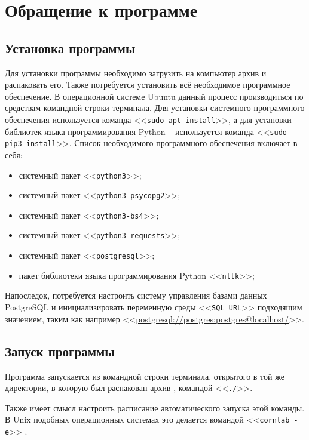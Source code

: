 \documentclass[a4paper,12pt]{article}
\begin{document}
  \newpage
  \section{Обращение к программе}
  \subsection{Установка программы}
  Для установки программы необходимо загрузить на компьютер архив \CRTzip{} и распаковать его.
  Также потребуется установить всё необходимое программное обеспечение.
  В операционной системе Ubuntu данный процесс производиться по средствам командной строки терминала.
  Для установки системного программного обеспечения используется команда <<\texttt{sudo apt install}>>,
  а для установки библиотек языка программирования Python -- используется команда <<\texttt{sudo pip3 install}>>.
  Список необходимого программного обеспечения включает в себя:
  \begin{itemize}
    \item системный пакет <<\texttt{python3}>>;
    \item системный пакет <<\texttt{python3-psycopg2}>>;
    \item системный пакет <<\texttt{python3-bs4}>>;
    \item системный пакет <<\texttt{python3-requests}>>;
    \item системный пакет <<\texttt{postgresql}>>;
    \item пакет библиотеки языка программирования Python <<\texttt{nltk}>>;
  \end{itemize}
  Напоследок, потребуется настроить систему управления базами данных PostgreSQL и инициализировать переменную среды <<\texttt{SQL\_URL}>> подходящим значением, таким как например <<\url{postgresql://postgres:postgres@localhost/}>>.

  \subsection{Запуск программы}
  Программа запускается из командной строки терминала,
  открытого в той же директории, в которую был распакован архив \CRTzip{},
  командой <<\texttt{./\CRTexe}>>.

  Также имеет смысл настроить расписание автоматического запуска этой команды.
  В Unix подобных операционных системах это делается командой <<\texttt{corntab -e}>>
  .

  \begin{CRTbibliography}
  \end{CRTbibliography}

  \CRTterminology
  \CRTlistRegistration
\end{document}
